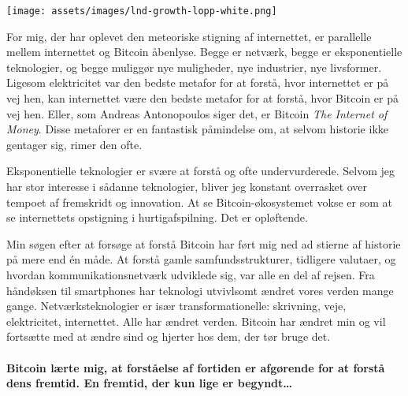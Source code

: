 \begin{center}
  \texttt{[image: assets/images/lnd-growth-lopp-white.png]}
  \label{fig:lnd-growth-lopp-white.png}
\end{center}

For mig, der har oplevet den meteoriske stigning af internettet, er parallelle
mellem internettet og Bitcoin åbenlyse. Begge er netværk, begge
er eksponentielle teknologier, og begge muliggør nye muligheder, nye
industrier, nye livsformer. Ligesom elektricitet var den bedste
metafor for at forstå, hvor internettet er på vej hen, kan internettet
være den bedste metafor for at forstå, hvor Bitcoin er på vej hen. Eller, som
Andreas Antonopoulos siger det, er Bitcoin \textit{The Internet of Money}.
Disse metaforer er en fantastisk påmindelse om, at selvom historie ikke gentager
sig, rimer den ofte.

Eksponentielle teknologier er svære at forstå og ofte undervurderede.
Selvom jeg har stor interesse i sådanne teknologier, bliver jeg
konstant overrasket over tempoet af fremskridt og innovation. At se
Bitcoin-økosystemet vokse er som at se internettets opstigning i
hurtigafspilning. Det er opløftende.

Min søgen efter at forsøge at forstå Bitcoin har ført mig ned ad stierne
af historie på mere end én måde. At forstå gamle samfundsstrukturer, tidligere valutaer,
og hvordan kommunikationsnetværk udviklede sig, var alle
en del af rejsen. Fra håndøksen til smartphones har teknologi
utvivlsomt ændret vores verden mange gange. Netværksteknologier
er især transformationelle: skrivning, veje, elektricitet, internettet.
Alle har ændret verden. Bitcoin har ændret min og
vil fortsætte med at ændre sind og hjerter hos dem, der tør bruge
det.

\paragraph{Bitcoin lærte mig, at forståelse af fortiden er afgørende for
at forstå dens fremtid. En fremtid, der kun lige er begyndt\ldots}


